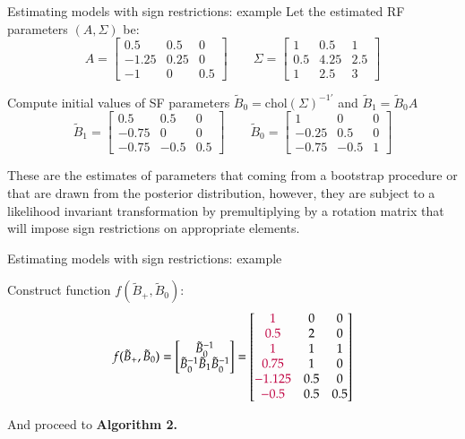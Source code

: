 \documentclass[notes,blackandwhite,mathsans,usenames,dvipsnames]{beamer}
\begin{document}
\begin{frame}{Estimating models with sign restrictions: example}
\small
{\color{mcxs2}Let the estimated RF parameters} $(A,\Sigma)$ {\color{mcxs2}be:}\footnotesize
$$A = \begin{bmatrix}0.5 & 0.5 &  0 \\-1.25& 0.25&  0\\-1& 0&  0.5\end{bmatrix}\qquad
\Sigma=\begin{bmatrix}1& 0.5&  1\\0.5& 4.25&  2.5\\1& 2.5&  3\end{bmatrix}$$

\small {\color{mcxs2}Compute initial values of SF parameters} $\tilde{B}_0=\text{chol}(\Sigma)^{-1\prime}$ {\color{mcxs2}and} $\tilde{B}_1=\tilde{B}_0A$\footnotesize
$$\tilde{B}_1 = \begin{bmatrix}0.5&  0.5 & 0\\-0.75 & 0&  0\\-0.75& -0.5&  0.5\end{bmatrix}\qquad
\tilde{B}_0 = \begin{bmatrix}1& 0&  0\\-0.25&  0.5& 0\\-0.75& -0.5&1\end{bmatrix}$$

\smallskip\small {\color{mcxs2}These are the estimates of parameters that coming from a bootstrap procedure or that are drawn from the posterior distribution, however, they are subject to a likelihood invariant transformation by premultiplying by a rotation matrix  that will impose sign restrictions on appropriate elements.}

\end{frame}





\begin{frame}{Estimating models with sign restrictions: example}

{\color{mcxs2}Construct function} $f(\tilde{B}_+,\tilde{B}_0)$:
$$f(\tilde{B}_+,\tilde{B}_0) = \begin{bmatrix}\tilde{B}_0^{-1}\\ \tilde{B}_0^{-1}\tilde{B}_1\tilde{B}_0^{-1}\end{bmatrix}=
\begin{bmatrix} {\color{purple}1}&0&0\\{\color{purple}0.5}&2&0\\{\color{purple}1}&1&1\\{\color{purple}0.75}&1&0\\{\color{purple}-1.125}&0.5&0\\{\color{purple}-0.5}&0.5&0.5 \end{bmatrix}$$

{\color{mcxs2}And proceed to} \textbf{Algorithm 2.}

\end{frame}
\end{document}
